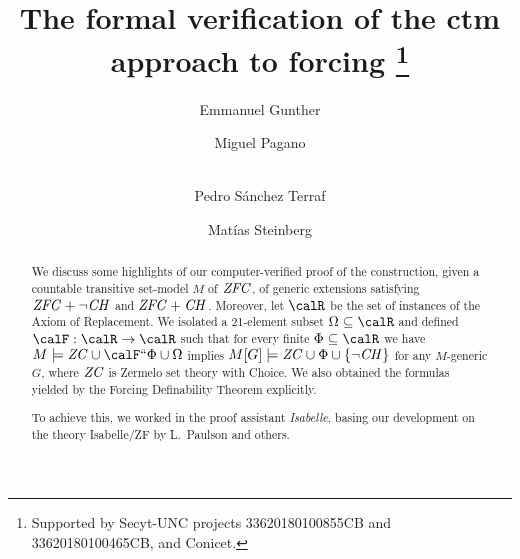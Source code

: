 \documentclass[runningheads]{llncs}
\begin{document}
%
\title{The formal verification of the ctm approach to forcing%
  \thanks{Supported by Secyt-UNC projects 33620180100855CB and 33620180100465CB, and Conicet.}%
}
%
%
\author{Emmanuel Gunther \and
Miguel Pagano \and \\
Pedro Sánchez Terraf%
\and
Matías Steinberg
}
%
%
%
\maketitle              %
%
\begin{abstract}
  We discuss some highlights of our computer-verified
  proof of the construction, given a countable transitive set-model $M$
  of $\mathit{ZFC}$, of generic extensions  satisfying $\mathit{ZFC}+\neg\mathit{CH}$ and $\mathit{ZFC}+\mathit{CH}$.
  Moreover, let $\calR$ be the set of instances of the Axiom of
  Replacement. We isolated a 21-element subset $\Omega\sbq\calR$ and
  defined $\calF:\calR\to\calR$
  such that for every finite $\Phi\sbq\calR$
  we have
  $M\models \ZC \cup \calF\dimg\Phi \cup \Omega$ implies
  $M[G]\models \mathit{ZC} \cup \Phi \cup \{ \neg \mathit{CH} \}$ for any $M$-generic $G$, where $\mathit{ZC}$ is
  Zermelo set theory with Choice.
  We also obtained the formulas yielded by the Forcing Definability Theorem
  explicitly.

  To achieve this, we worked in the proof assistant \emph{Isabelle},
  basing our development on the theory Isabelle/ZF by L.~Paulson and
  others.

\end{abstract}
%
%
%

 
\end{document}
